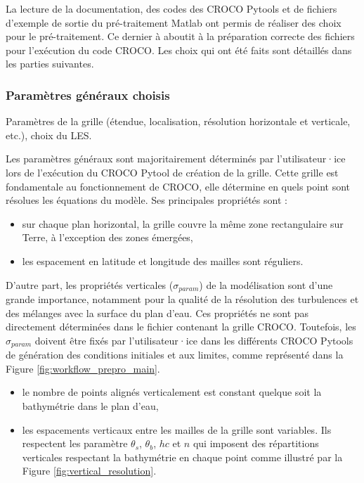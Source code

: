 \documentclass[10pt,a4paper,titlepage]{article}
\begin{document}
    La lecture de la documentation, des codes des CROCO Pytools et de fichiers d'exemple de sortie du pré-traitement Matlab ont permis de réaliser des choix pour le pré-traitement.
    Ce dernier à aboutit à la préparation correcte des fichiers pour l'exécution du code CROCO.
    Les choix qui ont été faits sont détaillés dans les parties suivantes.
    
    
    \subsubsection{Paramètres généraux choisis}
    \label{subsub:param_generaux}
    {\color{lightgrey}
        Paramètres de la grille (étendue, localisation, résolution horizontale et verticale, etc.), choix du LES.
    }
    
    Les paramètres généraux sont majoritairement déterminés par l'utilisateur·ice lors de l'exécution du CROCO Pytool de création de la grille.
    Cette grille est fondamentale au fonctionnement de CROCO, elle détermine en quels point sont résolues les équations du modèle. Ses principales propriétés sont :
    
    \begin{itemize}
        \item sur chaque plan horizontal, la grille couvre la même zone rectangulaire sur Terre, à l'exception des zones émergées,
        \item les espacement en latitude et longitude des mailles sont réguliers.
    \end{itemize}
    
    D'autre part, les propriétés verticales ($\sigma_{param}$) de la modélisation sont d'une grande importance, notamment pour la qualité de la résolution des turbulences et des mélanges avec la surface du plan d'eau.
    Ces propriétés ne sont pas directement déterminées dans le fichier contenant la grille CROCO.
    Toutefois, les $\sigma_{param}$ doivent être fixés par l'utilisateur·ice dans les différents CROCO Pytools de génération des conditions initiales et aux limites, comme représenté dans la Figure \ref{fig:workflow_prepro_main}.
    
    \begin{itemize}
        \item le nombre de points alignés verticalement est constant quelque soit la bathymétrie dans le plan d'eau,
        \item les espacements verticaux entre les mailles de la grille sont variables. Ils respectent les paramètre $\theta_s$, $\theta_b$, $hc$ et $n$ qui imposent des répartitions verticales respectant la bathymétrie en chaque point comme illustré par la Figure \ref{fig:vertical_resolution}.
    \end{itemize}
    
\end{document}

